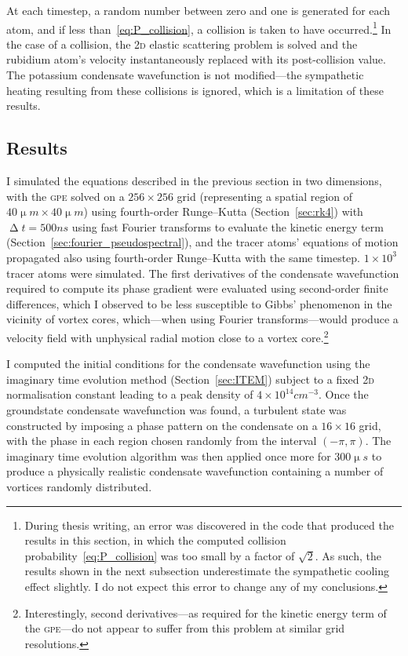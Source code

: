 At each timestep, a random number between zero and one is generated for each atom, and if less than~\eqref{eq:P_collision}, a collision is taken to have occurred.\footnote{During thesis writing, an error was discovered in the code that produced the results in this section, in which the computed collision probability~\eqref{eq:P_collision} was too small by a factor of $\sqrt{2}$. As such, the results shown in the next subsection underestimate the sympathetic cooling effect slightly. I do not expect this error to change any of my conclusions.} In the case of a collision, the \textsc{2d} elastic scattering problem is solved and the rubidium atom's velocity instantaneously replaced with its post-collision value. The potassium condensate wavefunction is not modified---the sympathetic heating resulting from these collisions is ignored, which is a limitation of these results.

\subsection{Results}

I simulated the equations described in the previous section in two dimensions, with the \textsc{gpe} solved on a $256\times256$ grid (representing a spatial region of $40\unit{\upmu m}\times40\unit{\upmu m}$) using fourth-order Runge--Kutta (Section~\ref{sec:rk4}) with $\upDelta t = 500\unit{ns}$ using fast Fourier transforms to evaluate the kinetic energy term (Section~\ref{sec:fourier_pseudospectral}), and the tracer atoms' equations of motion propagated also using fourth-order Runge--Kutta with the same timestep. $1\times10^3$ tracer atoms were simulated. The first derivatives of the condensate wavefunction required to compute its phase gradient were evaluated using second-order finite differences, which I observed to be less susceptible to Gibbs' phenomenon in the vicinity of vortex cores, which---when using Fourier transforms---would produce a velocity field with unphysical radial motion close to a vortex core.\footnote{Interestingly, second derivatives---as required for the kinetic energy term of the \textsc{gpe}---do not appear to suffer from this problem at similar grid resolutions.}

I computed the initial conditions for the condensate wavefunction using the imaginary time evolution method (Section~\ref{sec:ITEM}) subject to a fixed \textsc{2d} normalisation constant leading to a peak density of $4\times 10^{14}\unit{cm}^{-3}$. Once the groundstate condensate wavefunction was found, a turbulent state was constructed by imposing a phase pattern on the condensate on a $16\times16$ grid, with the phase in each region chosen randomly from the interval $(-\pi, \pi)$. The imaginary time evolution algorithm was then applied once more for $300\unit{\upmu s}$ to produce a physically realistic condensate wavefunction containing a number of vortices randomly distributed.

